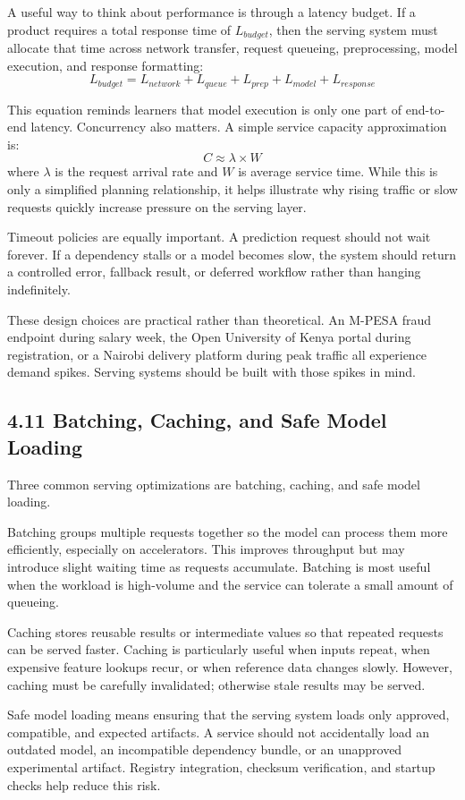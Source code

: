 \documentclass[12pt,a4paper]{article}
\begin{document}
A useful way to think about performance is through a latency budget. If a product requires a total response time of $L_{budget}$, then the serving system must allocate that time across network transfer, request queueing, preprocessing, model execution, and response formatting:
\[ L_{budget} = L_{network} + L_{queue} + L_{prep} + L_{model} + L_{response} \]

This equation reminds learners that model execution is only one part of end-to-end latency. Concurrency also matters. A simple service capacity approximation is:
\[ C \approx \lambda \times W \]
where $\lambda$ is the request arrival rate and $W$ is average service time. While this is only a simplified planning relationship, it helps illustrate why rising traffic or slow requests quickly increase pressure on the serving layer.

Timeout policies are equally important. A prediction request should not wait forever. If a dependency stalls or a model becomes slow, the system should return a controlled error, fallback result, or deferred workflow rather than hanging indefinitely.

These design choices are practical rather than theoretical. An M-PESA fraud endpoint during salary week, the Open University of Kenya portal during registration, or a Nairobi delivery platform during peak traffic all experience demand spikes. Serving systems should be built with those spikes in mind.

\subsection*{4.11 Batching, Caching, and Safe Model Loading}
Three common serving optimizations are batching, caching, and safe model loading.

Batching groups multiple requests together so the model can process them more efficiently, especially on accelerators. This improves throughput but may introduce slight waiting time as requests accumulate. Batching is most useful when the workload is high-volume and the service can tolerate a small amount of queueing.

Caching stores reusable results or intermediate values so that repeated requests can be served faster. Caching is particularly useful when inputs repeat, when expensive feature lookups recur, or when reference data changes slowly. However, caching must be carefully invalidated; otherwise stale results may be served.

Safe model loading means ensuring that the serving system loads only approved, compatible, and expected artifacts. A service should not accidentally load an outdated model, an incompatible dependency bundle, or an unapproved experimental artifact. Registry integration, checksum verification, and startup checks help reduce this risk.
\end{document}
